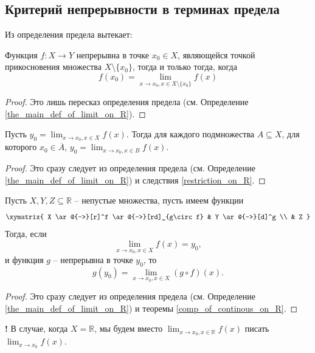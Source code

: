 \subsection{Критерий непрерывности в терминах предела}

Из определения предела вытекает:

\begin{theorem}\label{criteria_of_continous}
Функция $f: X \to Y$ непрерывна в точке $x_0 \in X$, являющейся точкой прикосновения множества $X\setminus\{x_0\}$, тогда и только тогда, когда
\[
f(x_0) = \lim_{x \to x_0, x\in X \setminus \{x_0\}}f(x)
\]
\end{theorem}
\begin{proof}
    Это лишь пересказ определения предела (см. Определение \ref{the_main_def_of_limit_on_R}).
\end{proof}

\begin{theorem}\label{limit_for_any_subset}
    Пусть $y_0 = \lim_{x \to x_0, x \in X} f(x)$. Тогда для каждого подмножества $A \subseteq X$, для которого $x_0 \in \overline{A}$, $y_0 = \lim_{x \to x_0, x \in B}f(x)$.
\end{theorem}

\begin{proof}
    Это сразу следует из определения предела (см. Определение \ref{the_main_def_of_limit_on_R}) и следствия \ref{restriction_on_R}.
\end{proof}





\begin{theorem}\label{lim_of_composition_on_R}
Пусть $X,Y,Z \subseteq \mathbb{R}$ -- непустые множества, пусть имеем функции 
\[
 \xymatrix{
 X \ar@{->}[r]^f \ar@{->}[rd]_{g\circ f} & Y \ar@{->}[d]^g \\
 & Z
 }
\]
Тогда, если
\[
 \lim_{x\to x_0, x\in X}f(x) = y_0,
\]
и функция $g$ -- непрерывна в точке $y_0$, то
\[
 g(y_0) = \lim_{x \to x_0, x \in X} (g \circ f)(x).
\]     
\end{theorem}
\begin{proof}
    Это сразу следует из определения предела (см. Определение \ref{the_main_def_of_limit_on_R}) и теоремы \ref{comp_of_continous_on_R}.
\end{proof}

\begin{mydanger}{\bf{!}}
    В случае, когда $X = \mathbb{R}$, мы будем вместо $\lim_{x \to x_0, x \in \mathbb{R}}f(x)$ писать $\lim_{x \to x_0}f(x).$
\end{mydanger}


